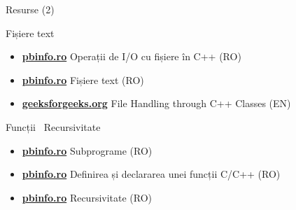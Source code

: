 ﻿\documentclass{beamer}
\begin{document}
\begin{frame}{Resurse (2)}
  \begin{block}{Fișiere text}
    \begin{itemize}\footnotesize\itemsep0pt
      \item \href{https://www.pbinfo.ro/articole/19047/operatii-de-intrare-iesire-cu-fisiere-in-cpp}{\textbf{pbinfo.ro}} \textemdash{} Operații de I/O cu fișiere în C++ (RO)
      \item \href{https://www.pbinfo.ro/articole/2673/fisiere-text}{\textbf{pbinfo.ro}} \textemdash{} Fișiere text (RO)
      \item \href{https://www.geeksforgeeks.org/cpp/file-handling-through-c-classes/}{\textbf{geeksforgeeks.org}} \textemdash{} File Handling through C++ Classes (EN)
    \end{itemize}
  \end{block}
  \vspace{-6pt}
  \begin{block}{Funcții \textbar\ Recursivitate}
    \begin{itemize}\footnotesize\itemsep0pt
      \item \href{https://www.pbinfo.ro/articole/3656/subprograme}{\textbf{pbinfo.ro}} \textemdash{} Subprograme (RO)
      \item \href{https://www.pbinfo.ro/articole/3664/definirea-si-declararea-unei-functii-c-c}{\textbf{pbinfo.ro}} \textemdash{} Definirea și declararea unei funcții C/C++ (RO)
      \item \href{https://www.pbinfo.ro/articole/3873/recursivitate}{\textbf{pbinfo.ro}} \textemdash{} Recursivitate (RO)
    \end{itemize}
  \end{block}
\end{frame}
\end{document}
